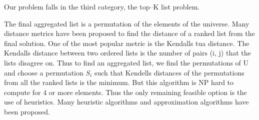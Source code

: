 Our problem falls in the third category, the top--K list problem.

The final aggregated list is a permutation of the elements of the universe. Many distance metrics have been proposed to find the distance of a ranked list from the final solution. One of the most popular metric is the Kendall\textsc{}s tua distance. The Kendall\textsc{}s distance between two ordered lists is the number of pairs (i, j) that the lists disagree on. Thus to find an aggregated list, we find the permutations of U and choose a permutation $S_i$ such that Kendell\textsc{}s distances of the permutations from all the ranked lists is the minimum. But this algorithm is NP hard to compute for 4 or more elements. Thus the only remaining feasible option is the use of heuristics. Many heuristic algorithms and approximation algorithms have been proposed.